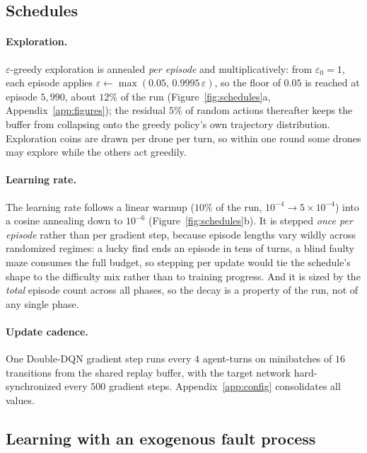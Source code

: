 \subsection{Schedules}
\label{subsec:train-schedules}

\paragraph{Exploration.}
$\varepsilon$-greedy exploration is annealed \emph{per episode} and
multiplicatively: from $\varepsilon_0 = 1$, each episode applies
$\varepsilon \leftarrow \max(0.05,\, 0.9995\,\varepsilon)$, so the floor of
$0.05$ is reached at episode $5{,}990$, about $12\%$ of the run
(Figure~\ref{fig:schedules}a, Appendix~\ref{app:figures}); the residual $5\%$ of
random actions thereafter keeps the buffer from collapsing onto the greedy
policy's own trajectory distribution. Exploration coins are drawn per drone per
turn, so within one round some drones may explore while the others act greedily.

\paragraph{Learning rate.}
The learning rate follows a linear warmup ($10\%$ of the run,
$10^{-4} \to 5\times10^{-4}$) into a cosine annealing down to $10^{-6}$
(Figure~\ref{fig:schedules}b). It is stepped \emph{once per episode} rather than
per gradient step, because episode lengths vary wildly across randomized regimes:
a lucky find ends an episode in tens of turns, a blind faulty maze consumes the
full budget, so stepping per update would tie the schedule's shape to the
difficulty mix rather than to training progress. And it is sized by the
\emph{total} episode count across all phases, so the decay is a property of the
run, not of any single phase.

\paragraph{Update cadence.}
One Double-DQN gradient step runs every $4$ agent-turns on minibatches of $16$
transitions from the shared replay buffer, with the target network
hard-synchronized every $500$ gradient steps. Appendix~\ref{app:config}
consolidates all values.

\subsection{Learning with an exogenous fault process}
\label{subsec:train-correctness}

